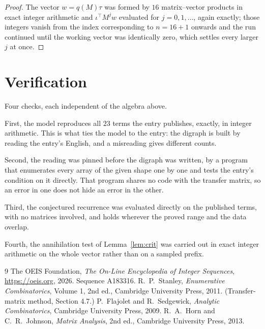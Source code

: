 \documentclass[11pt,a4paper]{article}
\theoremstyle{plain}
\theoremstyle{definition}
\begin{document}
\begin{proof}
The vector $w=q(M)\tau$ was formed by $16$ matrix--vector products in exact integer
arithmetic and $\iota^{\!\top}M^{j}w$ evaluated for $j=0,1,\dots$, again exactly; those
integers vanish from the index corresponding to $n=16+1$ onwards and the run continued
until the working vector was identically zero, which settles every larger $j$ at once.
\end{proof}

\section{Verification}

Four checks, each independent of the algebra above.

First, the model reproduces all $23$ terms the entry publishes, exactly, in integer
arithmetic. This is what ties the model to the entry: the digraph is built by reading the
entry's English, and a misreading gives different counts.

Second, the reading was pinned before the digraph was written, by a program that enumerates
every array of the given shape one by one and tests the entry's condition on it directly. That program shares no code with the transfer matrix, so an error in one does not
hide an error in the other.

Third, the conjectured recurrence was evaluated directly on the published terms, with no
matrices involved, and holds wherever the proved range and the data overlap.

Fourth, the annihilation test of Lemma~\ref{lem:crit} was carried out in exact integer
arithmetic on the whole vector rather than on a sampled prefix.

\begin{thebibliography}{9}
 The OEIS Foundation, \emph{The On-Line Encyclopedia of Integer
Sequences}, \url{https://oeis.org}, 2026. Sequence A183316.
 R.~P.~Stanley, \emph{Enumerative Combinatorics}, Volume 1, 2nd ed.,
Cambridge University Press, 2011. (Transfer-matrix method, Section 4.7.)
 P.~Flajolet and R.~Sedgewick, \emph{Analytic Combinatorics}, Cambridge
University Press, 2009.
 R.~A.~Horn and C.~R.~Johnson, \emph{Matrix Analysis}, 2nd ed., Cambridge
University Press, 2013.
\end{thebibliography}
\end{document}
